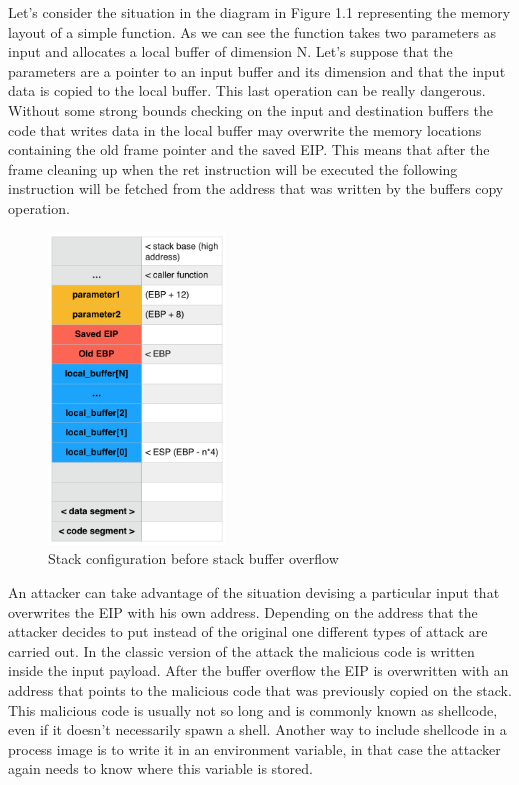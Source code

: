 \documentclass[Lau,binding=0.6cm]{sapthesis}
\begin{document}
Let’s consider the situation in the diagram in Figure 1.1 representing the memory layout of a simple function. As we can see the function takes two parameters as input and allocates a local buffer of dimension N.
Let’s suppose that the parameters are a pointer to an input buffer and its dimension and that the input data is copied to the local buffer. This last operation can be really dangerous. Without some strong bounds checking on the input and destination buffers the code that writes data in the local buffer may overwrite the memory locations containing the old frame pointer and the saved EIP. This means that after the frame cleaning up when the ret instruction will be executed the following instruction will be fetched from the address that was written by the buffers copy operation.  
\begin{figure}
\centering
\includegraphics[width=0.42\textwidth]{overflow}
\caption{Stack configuration before stack buffer overflow}
\label{fig:largenenough}
\end{figure}
An attacker can take advantage of the situation devising a particular input that overwrites the EIP with his own address. Depending on the address that the attacker decides to put instead of the original one different types of attack are carried out.
In the classic version of the attack the malicious code is written inside the input payload. After the buffer overflow the EIP is overwritten with an address that points to the malicious code that was previously copied on the stack. This malicious code is usually not so long and is commonly known as shellcode, even if it doesn’t necessarily spawn a shell. Another way to include shellcode in a process image is to write it in an environment variable, in that case the attacker again needs to know where this variable is stored.
\end{document}
